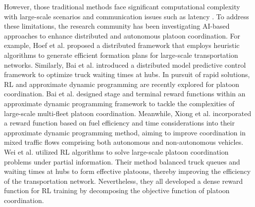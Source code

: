 \documentclass[lettersize,journal]{IEEEtran}
\begin{document}
However, those traditional methods face significant computational complexity with large-scale scenarios \cite{larson2013coordinated, liang2013fuel, van2015fuel} and communication issues such as latency \cite{zhang2017platoon}. 
To address these limitations, the research community has been investigating AI-based approaches to enhance distributed and autonomous platoon coordination.
For example, Hoef et al. \cite{hoef2019predictive} proposed a distributed framework that employs heuristic algorithms to generate efficient formation plans for large-scale transportation networks.
Similarly, Bai et al. \cite{bai2021event} introduced a distributed model predictive control framework to optimize truck waiting times at hubs. 
In pursuit of rapid solutions, RL and approximate dynamic programming are recently explored   for platoon coordination. 
Bai et al. \cite{bai2023large} designed stage and terminal reward functions within an approximate dynamic programming framework to tackle the complexities of large-scale multi-fleet platoon coordination. 
Meanwhile, Xiong et al. \cite{xiong2024approximate} incorporated a reward function based on fuel efficiency and time considerations into their approximate dynamic programming method, aiming to improve coordination in mixed traffic flows comprising both autonomous and non-autonomous vehicles.
Wei et al. \cite{wei2023multi} utilized RL algorithms to solve large-scale platoon coordination problems under partial information. Their method balanced truck queues and waiting times at hubs to form effective platoons, thereby improving the efficiency of the transportation network. 
Nevertheless, they all developed a dense reward function for RL training by decomposing the objective function of platoon coordination. 
\end{document}
